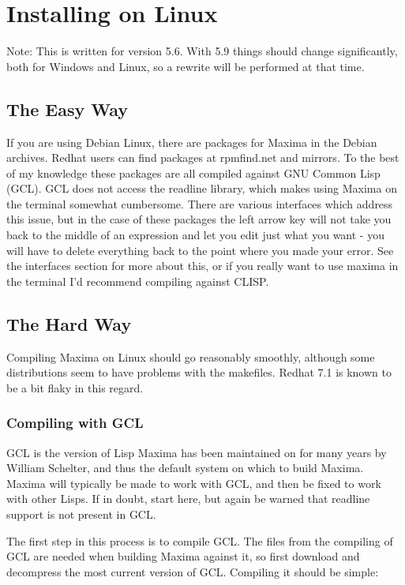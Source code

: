 
\section{Installing on Linux}

Note:  This is written for version 5.6.  With 5.9 things should change
significantly, both for Windows and Linux, so a rewrite will be performed
at that time.

\subsection{The Easy Way}

If you are using Debian Linux, there are packages for Maxima in the
Debian archives. Redhat users can find packages at rpmfind.net and
mirrors. To the best of my knowledge these packages are all compiled
against GNU Common Lisp (GCL). GCL does not access the readline library,
which makes using Maxima on the terminal somewhat cumbersome. There
are various interfaces which address this issue, but in the case of
these packages the left arrow key will not take you back to the middle
of an expression and let you edit just what you want - you will have
to delete everything back to the point where you made your error.
See the interfaces section for more about this, or if you really want
to use maxima in the terminal I'd recommend compiling against CLISP. 


\subsection{The Hard Way}

Compiling Maxima on Linux should go reasonably smoothly, although
some distributions seem to have problems with the makefiles. Redhat
7.1 is known to be a bit flaky in this regard.


\subsubsection{Compiling with GCL }

GCL is the version of Lisp Maxima has been maintained on for many
years by William Schelter, and thus the default system on which to
build Maxima. Maxima will typically be made to work with GCL, and
then be fixed to work with other Lisps. If in doubt, start here, but
again be warned that readline support is not present in GCL.

The first step in this process is to compile GCL. The files from the
compiling of GCL are needed when building Maxima against it, so first
download and decompress the most current version of GCL. Compiling
it should be simple:

